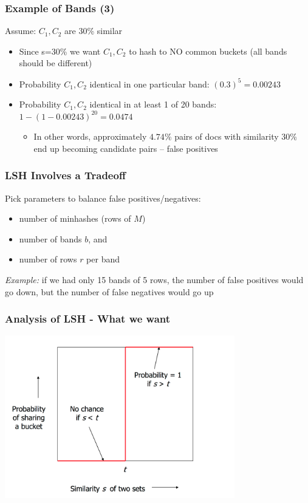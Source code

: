 \documentclass[svgnames]{beamer}
\begin{document}
  
\begin{frame} \frametitle{Example of Bands (3)}

\begin{block}{Assume: $C_1, C_2$ are 30\% similar}
\begin{itemize}
\item Since s=30\% we want $C_1, C_2$ to hash to NO common buckets (all bands should be different)
\item Probability $C_1, C_2$ identical in one particular band: $(0.3)^5 = 0.00243$
\item Probability $C_1, C_2$ identical in at least 1 of 20 bands: $1 - (1 - 0.00243)^{20} = 0.0474$
  \begin{itemize}
  \item In other words, approximately $4.74$\% pairs of docs with similarity 30\% end up becoming candidate pairs -- false positives
  \end{itemize}
\end{itemize}
\end{block}
\end{frame}

  
\begin{frame} \frametitle{LSH Involves a Tradeoff}
\begin{block}{}
Pick parameters to balance false positives/negatives:
\begin{itemize}
  \item number of minhashes (rows of $M$)
  \item number of bands $b$, and
  \item number of rows $r$ per band
\end{itemize}
\end{block}

\emph{Example:} if we had only 15 bands of 5 rows, the number of false positives would go down, but the number of false negatives would go up
\end{frame}

  
\begin{frame} \frametitle{Analysis of LSH - What we want}
\includegraphics[width=10cm]{what-we-want}
\end{frame}
\end{document}
